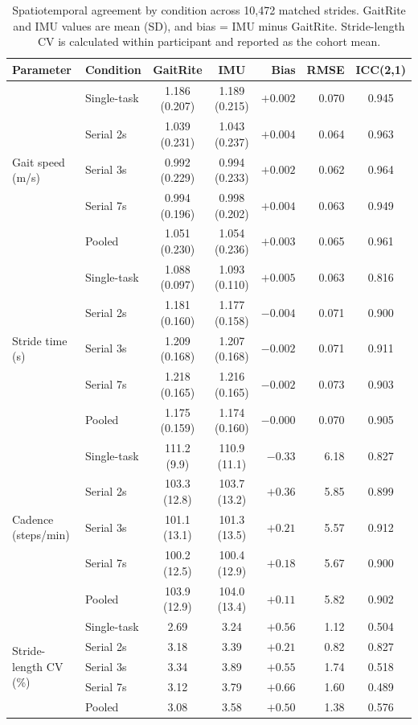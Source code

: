 \documentclass[11pt]{article}
\begin{document}
\begin{table}[!ht]
\centering
\caption{Spatiotemporal agreement by condition across 10{,}472 matched strides. GaitRite and IMU values are mean (SD), and bias = IMU minus GaitRite. Stride-length CV is calculated within participant and reported as the cohort mean.}
\label{tab:spatiotemporal}
\small
\begin{tabular}{@{}llccrrc@{}}
\toprule
Parameter & Condition & GaitRite & IMU & Bias & RMSE & ICC(2,1) \\
\midrule
\multirow{5}{*}{Gait speed (m/s)}
 & Single-task & 1.186 (0.207) & 1.189 (0.215) & $+0.002$ & 0.070 & 0.945 \\
 & Serial 2s   & 1.039 (0.231) & 1.043 (0.237) & $+0.004$ & 0.064 & 0.963 \\
 & Serial 3s   & 0.992 (0.229) & 0.994 (0.233) & $+0.002$ & 0.062 & 0.964 \\
 & Serial 7s   & 0.994 (0.196) & 0.998 (0.202) & $+0.004$ & 0.063 & 0.949 \\
 & Pooled      & 1.051 (0.230) & 1.054 (0.236) & $+0.003$ & 0.065 & 0.961 \\
\midrule
\multirow{5}{*}{Stride time (s)}
 & Single-task & 1.088 (0.097) & 1.093 (0.110) & $+0.005$ & 0.063 & 0.816 \\
 & Serial 2s   & 1.181 (0.160) & 1.177 (0.158) & $-0.004$ & 0.071 & 0.900 \\
 & Serial 3s   & 1.209 (0.168) & 1.207 (0.168) & $-0.002$ & 0.071 & 0.911 \\
 & Serial 7s   & 1.218 (0.165) & 1.216 (0.165) & $-0.002$ & 0.073 & 0.903 \\
 & Pooled      & 1.175 (0.159) & 1.174 (0.160) & $-0.000$ & 0.070 & 0.905 \\
\midrule
\multirow{5}{*}{Cadence (steps/min)}
 & Single-task & 111.2 (9.9) & 110.9 (11.1) & $-0.33$ & 6.18 & 0.827 \\
 & Serial 2s   & 103.3 (12.8) & 103.7 (13.2) & $+0.36$ & 5.85 & 0.899 \\
 & Serial 3s   & 101.1 (13.1) & 101.3 (13.5) & $+0.21$ & 5.57 & 0.912 \\
 & Serial 7s   & 100.2 (12.5) & 100.4 (12.9) & $+0.18$ & 5.67 & 0.900 \\
 & Pooled      & 103.9 (12.9) & 104.0 (13.4) & $+0.11$ & 5.82 & 0.902 \\
\midrule
\multirow{5}{*}{Stride-length CV (\%)}
 & Single-task & 2.69 & 3.24 & $+0.56$ & 1.12 & 0.504 \\
 & Serial 2s   & 3.18 & 3.39 & $+0.21$ & 0.82 & 0.827 \\
 & Serial 3s   & 3.34 & 3.89 & $+0.55$ & 1.74 & 0.518 \\
 & Serial 7s   & 3.12 & 3.79 & $+0.66$ & 1.60 & 0.489 \\
 & Pooled      & 3.08 & 3.58 & $+0.50$ & 1.38 & 0.576 \\
\bottomrule
\end{tabular}
\end{table}
\end{document}
